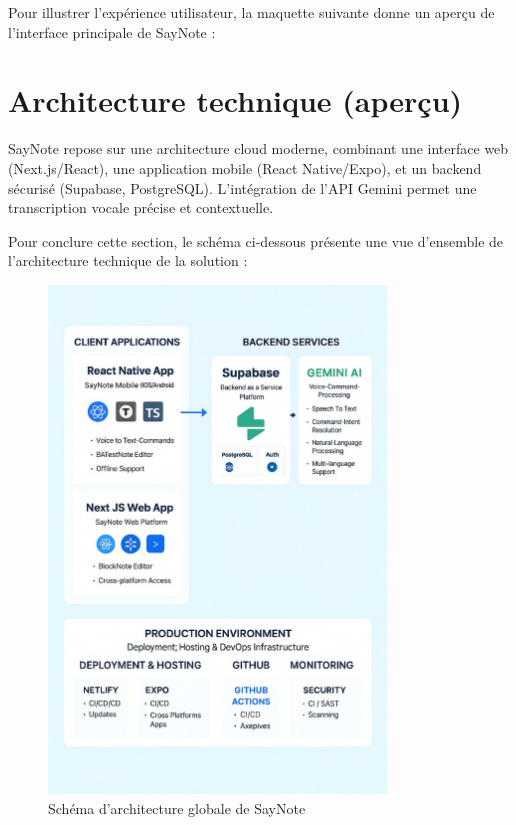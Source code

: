 Pour illustrer l’expérience utilisateur, la maquette suivante donne un aperçu de l’interface principale de SayNote :

\section{Architecture technique (aperçu)}
SayNote repose sur une architecture cloud moderne, combinant une interface web (Next.js/React), une application mobile (React Native/Expo), et un backend sécurisé (Supabase, PostgreSQL). L’intégration de l’API Gemini permet une transcription vocale précise et contextuelle.

Pour conclure cette section, le schéma ci-dessous présente une vue d’ensemble de l’architecture technique de la solution :

\begin{figure}[H]
    \centering
    \includegraphics[width=0.8\textwidth]{assets/docs/global_architecture.png}
    \caption{Schéma d’architecture globale de SayNote}
    \label{fig:global-architecture}
\end{figure}

